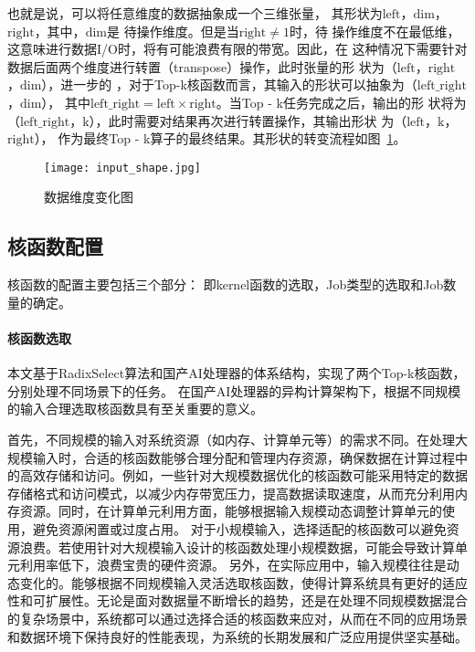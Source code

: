     也就是说，可以将任意维度的数据抽象成一个三维张量，
    其形状为\(\text{left}\)，\(\text{dim}\)，\(\text{right}\)，其中，\(\text{dim}\)是
    待操作维度。但是当\(\text{right}≠1\)时，待
    操作维度不在最低维，这意味进行数据I/O时，将有可能浪费有限的带宽。因此，在
    这种情况下需要针对数据后面两个维度进行转置（transpose）操作，此时张量的形
    状为（\(\text{left}\)，\(\text{right}\)，\(\text{dim}\)），进一步的
    ，对于Top-k核函数而言，其输入的形状可以抽象为（\(\text{left\_right}\)，\(\text{dim}\)），
    其中\(\text{left\_right}=\text{left}×\text{right}\)。当Top - k任务完成之后，输出的形
    状将为（\(\text{left\_right}\)，\(\text{k}\)），此时需要对结果再次进行转置操作，其输出形状
    为（\(\text{left}\)，\(\text{k}\)，\(\text{right}\)），
    作为最终Top - k算子的最终结果。其形状的转变流程如图~\ref{fig:input_shape}。
    
    \begin{figure}[ht]
        \centering
        \texttt{[image: input\_shape.jpg]}
        \caption{数据维度变化图}
        \label{fig:input_shape}
    \end{figure}
    
    
    \subsection{核函数配置}
    核函数的配置主要包括三个部分：
    即kernel函数的选取，Job类型的选取和Job数量的确定。
        \paragraph{核函数选取}
        本文基于RadixSelect算法和国产AI处理器的体系结构，实现了两个Top-k核函数，分别处理不同场景下的任务。
        在国产AI处理器的异构计算架构下，根据不同规模的输入合理选取核函数具有至关重要的意义。

        首先，不同规模的输入对系统资源（如内存、计算单元等）的需求不同。在处理大规模输入时，合适的核函数能够合理分配和管理内存资源，确保数据在计算过程中的高效存储和访问。例如，一些针对大规模数据优化的核函数可能采用特定的数据存储格式和访问模式，以减少内存带宽压力，提高数据读取速度，从而充分利用内存资源。同时，在计算单元利用方面，能够根据输入规模动态调整计算单元的使用，避免资源闲置或过度占用。
        对于小规模输入，选择适配的核函数可以避免资源浪费。若使用针对大规模输入设计的核函数处理小规模数据，可能会导致计算单元利用率低下，浪费宝贵的硬件资源。
        另外，在实际应用中，输入规模往往是动态变化的。能够根据不同规模输入灵活选取核函数，使得计算系统具有更好的适应性和可扩展性。无论是面对数据量不断增长的趋势，还是在处理不同规模数据混合的复杂场景中，系统都可以通过选择合适的核函数来应对，从而在不同的应用场景和数据环境下保持良好的性能表现，为系统的长期发展和广泛应用提供坚实基础。





